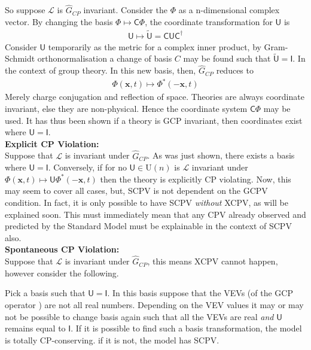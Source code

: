 So suppose $\mathcal{L}$ is $\hat{G}_{CP}$ invariant. Consider the $\Phi$ as a n-dimensional complex vector. By changing the basis $\Phi \mapsto \mathsf{C}\Phi$, the coordinate transformation for $\mathsf{U}$ is 
\begin{align*}
\mathsf{U} \mapsto \tilde{\mathsf{U}}= \mathsf{CU}\mathsf{C}^\dagger
\end{align*}
Consider $\mathsf{U}$ temporarily as the metric for a complex inner product, by Gram-Schmidt orthonormalisation a change of basis $C$ may be found such that $\tilde{\mathsf{U}}=\mathsf{I}$. In the context of group theory. In this new basis, then, $\hat{G}_{CP}$ reduces to
\begin{align*}
\Phi(\mathbf{x},t) \mapsto \Phi^*(-\mathbf{x},t)
\end{align*}
Merely charge conjugation and reflection of space. Theories are always coordinate invariant, else they are non-physical. Hence the coordinate system $\mathsf{C}\Phi$ may be used. It has thus been shown if a theory is GCP invariant, then coordinates exist where $\mathsf{U}=\mathsf{I}$.\\

\textbf{Explicit CP Violation:}\\
Suppose that $\mathcal{L}$ is invariant under $\hat{G}_{CP}$. As was just shown, there exists a basis where $\mathsf{U}=\mathsf{I}$. Conversely, if for no $\mathsf{U}\in\mathrm{U}(n)$ is $\mathcal{L}$ invariant under $\Phi(\mathbf{x},t) \mapsto \mathsf{U}\Phi^*(-\mathbf{x},t)$ then the theory is explicitly CP violating. Now, this may seem to cover all cases, but, SCPV is not dependent on the GCPV condition. In fact, it is only possible to have SCPV \textit{without} XCPV, as will be explained soon. This must immediately mean that any CPV already observed and predicted by the Standard Model must be explainable in the context of SCPV also.\\

\textbf{Spontaneous CP Violation:}\\
Suppose that $\mathcal{L}$ is invariant under $\hat{G}_{CP}$, this means XCPV cannot happen, however consider the following.

Pick a basis such that $\mathsf{U}=\mathsf{I}$. In this basis suppose that the VEVs (of the GCP operator ) are not all real numbers. Depending on the VEV values it may or may not be possible to change basis again such that all the VEVs are real \textit{and} $\mathsf{U}$ remains equal to $\mathsf{I}$. If it is possible to find such a basis transformation, the model is totally CP-conserving. if it is not, the model has SCPV.

